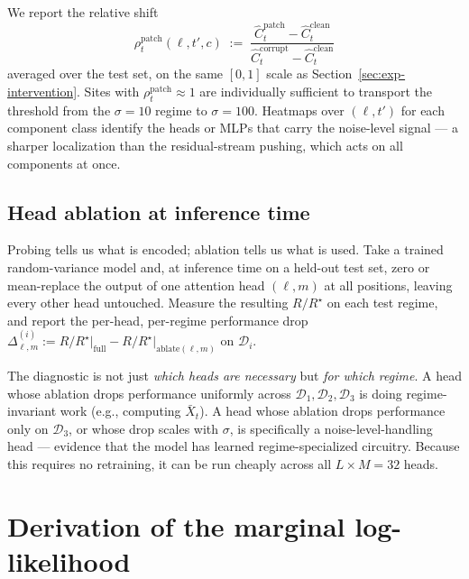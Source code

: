 \documentclass[11pt]{article}
\begin{document}
We report the relative shift
\[
\rho_t^{\mathrm{patch}}(\ell, t', c) \;:=\; \frac{\widehat C_t^{\mathrm{patch}} - \widehat C_t^{\mathrm{clean}}}{\widehat C_t^{\mathrm{corrupt}} - \widehat C_t^{\mathrm{clean}}}
\]
averaged over the test set, on the same $[0, 1]$ scale as Section~\ref{sec:exp-intervention}. Sites with $\rho_t^{\mathrm{patch}} \approx 1$ are individually sufficient to transport the threshold from the $\sigma = 10$ regime to $\sigma = 100$. Heatmaps over $(\ell, t')$ for each component class identify the heads or MLPs that carry the noise-level signal --- a sharper localization than the residual-stream pushing, which acts on all components at once.

\subsection{Head ablation at inference time}
\label{sec:exp-ablation}

Probing tells us what is encoded; ablation tells us what is used. Take a trained random-variance model and, at inference time on a held-out test set, zero or mean-replace the output of one attention head $(\ell, m)$ at all positions, leaving every other head untouched. Measure the resulting $R/R^\star$ on each test regime, and report the per-head, per-regime performance drop $\Delta_{\ell,m}^{(i)} := R/R^\star\big|_{\text{full}} - R/R^\star\big|_{\text{ablate}(\ell, m)}$ on $\mathcal{D}_i$.

The diagnostic is not just \emph{which heads are necessary} but \emph{for which regime}. A head whose ablation drops performance uniformly across $\mathcal{D}_1, \mathcal{D}_2, \mathcal{D}_3$ is doing regime-invariant work (e.g., computing $\bar X_t$). A head whose ablation drops performance only on $\mathcal{D}_3$, or whose drop scales with $\sigma$, is specifically a noise-level-handling head --- evidence that the model has learned regime-specialized circuitry. Because this requires no retraining, it can be run cheaply across all $L \times M = 32$ heads.

\appendix

\section{Derivation of the marginal log-likelihood}
\label{app:marginal-derivation}
\end{document}

